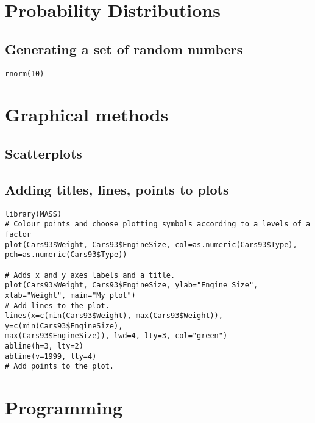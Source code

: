 \begin{itemize}
\chapter{Probability Distributions}
\section{Generating a set of random numbers}

\begin{framed}
\large \begin{verbatim}
rnorm(10)
\end{verbatim}\large
\end{framed}


\newpage
\chapter{Graphical methods}

\section{Scatterplots}


\section{Adding titles, lines, points to plots}


\large \begin{verbatim}
library(MASS)
# Colour points and choose plotting symbols according to a levels of a factor
plot(Cars93$Weight, Cars93$EngineSize, col=as.numeric(Cars93$Type),
pch=as.numeric(Cars93$Type))

# Adds x and y axes labels and a title.
plot(Cars93$Weight, Cars93$EngineSize, ylab="Engine Size",
xlab="Weight", main="My plot")
# Add lines to the plot.
lines(x=c(min(Cars93$Weight), max(Cars93$Weight)), y=c(min(Cars93$EngineSize),
max(Cars93$EngineSize)), lwd=4, lty=3, col="green")
abline(h=3, lty=2)
abline(v=1999, lty=4)
# Add points to the plot.
\end{verbatim}\large

\newpage
\chapter{Programming}


\end{itemize}
